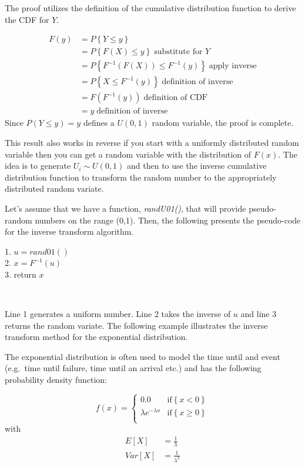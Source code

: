 \documentclass[
]{book}
\theoremstyle{definition}
\theoremstyle{definition}
\theoremstyle{definition}
\theoremstyle{definition}
\theoremstyle{remark}
\begin{document}
The proof utilizes the definition of the cumulative distribution
function to derive the CDF for \(Y\).

\[
\begin{split}
F(y) & = P\left\{Y \leq y \right\}  \\
    & = P\left\{F(X) \leq y\right\}  \; \text{substitute for } Y \\
    & = P\left\{F^{-1}(F(X)) \leq F^{-1}(y)\right\}  \; \text{apply inverse} \\ 
    & = P\left\{X \leq F^{-1}(y)\right\}  \; \text{definition of inverse} \\ 
    & = F(F^{-1}(y)) \; \text{definition of CDF}\\ 
    & = y \; \text{definition of inverse} 
\end{split}
\]
Since \(P(Y \leq y) = y\) defines a \(U(0,1)\) random variable, the proof is
complete.

This result also works in reverse if you start with a uniformly
distributed random variable then you can get a random variable with the
distribution of \(F(x)\). The idea is to generate \(U_{i} \sim U(0,1)\) and
then to use the inverse cumulative distribution function to transform
the random number to the appropriately distributed random variate.

Let's assume that we have a function, \emph{randU01()}, that will provide
pseudo-random numbers on the range (0,1). Then, the following presents the pseudo-code for the inverse transform algorithm.

1. \(u = rand01()\)\\
2. \(x = F^{-1}(u)\)\\
3. return \(x\)

~

Line 1 generates a uniform number. Line 2 takes the inverse of \(u\) and line 3 returns the random variate. The following example illustrates the inverse transform method for the
exponential distribution.

The exponential distribution is often used to model the time until and event (e.g.~time
until failure, time until an arrival etc.) and has the following probability density function:

\[
f(x) =
\begin{cases}
0.0 & \text{if} \left\{x < 0\right\}\\
\lambda e^{-\lambda x} & \text{if} \left\{x \geq 0 \right\} \\
\end{cases}
\]
with
\[
\begin{split}
E\left[X\right] &= \frac{1}{\lambda} \\
Var\left[X\right] &= \frac{1}{\lambda^2}
\end{split}
\]
\end{document}
